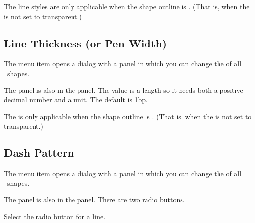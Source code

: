 \begin{information}
The line styles are only applicable when the \gls{shape}
outline is . (That is, when 
the  is not set to \gls{transparent}.)
\end{information}

\subsection{Line Thickness (or Pen Width)}\label{sec:penwidth}


The  menu item opens a dialog
with a  panel in which
you can change the  
of all \selected\ \glspl{shape}.


The  panel is also in the 
 panel. The value is a length so it needs
both a positive decimal number and a unit. The default is 1\gls{bp}.

\begin{information}
The  is only applicable when the \gls{shape}
outline is . (That is, when 
the  is not set to \gls{transparent}.)
\end{information}

\subsection{Dash Pattern}\label{sec:dashpattern}


The  menu item opens a dialog
with a  panel in which
you can change the  
of all \selected\ \glspl{shape}.


The  panel is also in the 
 panel. There are two radio buttons.


Select the  radio button for a 
 line.

